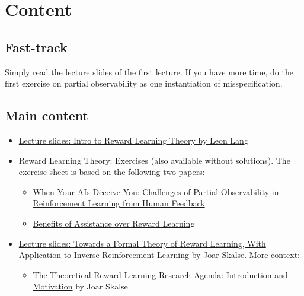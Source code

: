 \documentclass[11pt]{article}
\begin{document}
\section*{Content}

\subsection*{Fast-track}

Simply read the lecture slides of the first lecture. If you have more time, do the first exercise on partial observability as one instantiation of misspecification.

\subsection*{Main content}

\begin{itemize}
  \item \href{https://docs.google.com/presentation/d/1cG2M68gj8osmrse97bza9cgCqqwoFXBvDIGpkv-HVgA/edit?usp=drive_link}{Lecture slides: Intro to Reward Learning Theory by Leon Lang}
  \item Reward Learning Theory: Exercises (also available without solutions). The exercise sheet is based on the following two papers:
  \begin{itemize}
    \item \href{https://arxiv.org/abs/2402.17747}{When Your AIs Deceive You: Challenges of Partial Observability in Reinforcement Learning from Human Feedback}
    \item \href{https://people.eecs.berkeley.edu/~russell/papers/neurips20ws-assistance}{Benefits of Assistance over Reward Learning}
  \end{itemize}
  \item \href{https://drive.google.com/file/d/1WLC-HILvYGmXo9kqUGEvekK6scURXQBl/view?usp=sharing}{Lecture slides: Towards a Formal Theory of Reward Learning, With Application to Inverse Reinforcement Learning} by Joar Skalse. More context:
  \begin{itemize}
    \item \href{https://www.lesswrong.com/s/TEybbkyHpMEB2HTv3/p/pJ3mDD7LfEwp3s5vG}{The Theoretical Reward Learning Research Agenda: Introduction and Motivation} by Joar Skalse
  \end{itemize}
\end{itemize}

\end{document}
